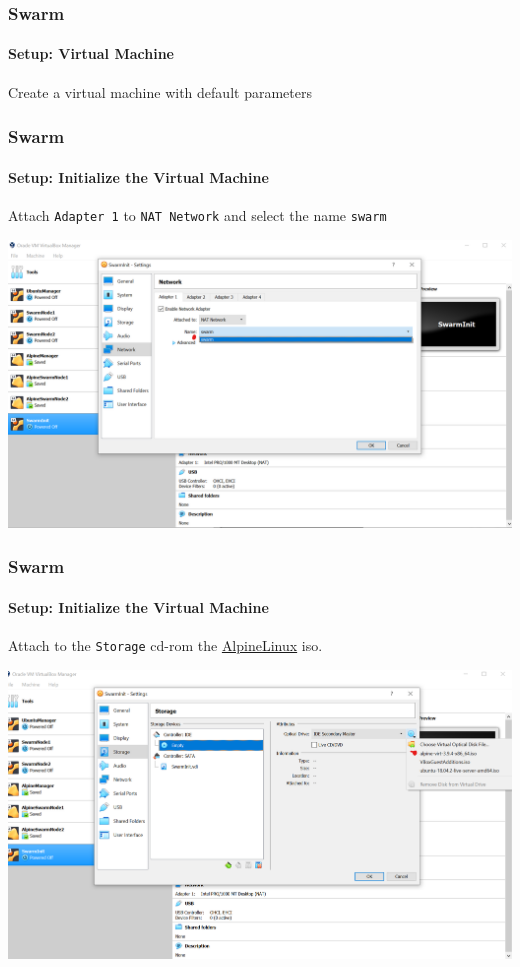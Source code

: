 \begin{frame}
\frametitle{Swarm}
\framesubtitle{Setup: Virtual Machine}
Create a virtual machine with default parameters
\end{frame}

\begin{frame}[fragile]
\frametitle{Swarm}
\framesubtitle{Setup: Initialize the Virtual Machine}
Attach \lstinline!Adapter 1! to \lstinline!NAT Network! and select the name \lstinline!swarm!\\
\begin{center}
\includegraphics[width=\columnwidth]{./Figure/swarm-vm-init-net}
\end{center}
\end{frame}


\begin{frame}[fragile]
\frametitle{Swarm}
\framesubtitle{Setup: Initialize the Virtual Machine}
Attach to the \lstinline!Storage! cd-rom the \href{http://dl-cdn.alpinelinux.org/alpine/v3.9/releases/x86_64/alpine-virt-3.9.4-x86_64.iso}{AlpineLinux} iso. \\
\begin{center}
\includegraphics[width=\columnwidth]{./Figure/swarm-vm-init-cdrom}
\end{center}
\end{frame}

